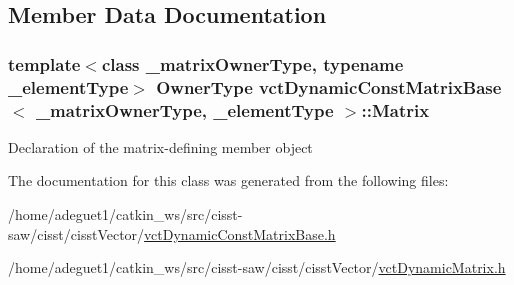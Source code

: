 \subsection{Member Data Documentation}
\hypertarget{classvct_dynamic_const_matrix_base_a46173996e3b23fd3dec1ff901a56b60c}{
\subsubsection[{Matrix}]{\setlength{\rightskip}{0pt plus 5cm}template$<$class \-\_\-matrix\-Owner\-Type, typename \-\_\-element\-Type$>$ {\bf Owner\-Type} {\bf vct\-Dynamic\-Const\-Matrix\-Base}$<$ \-\_\-matrix\-Owner\-Type, \-\_\-element\-Type $>$\-::Matrix\hspace{0.3cm}{\ttfamily [protected]}}}\label{classvct_dynamic_const_matrix_base_a46173996e3b23fd3dec1ff901a56b60c}
Declaration of the matrix-\/defining member object 

The documentation for this class was generated from the following files\-:\begin{DoxyCompactItemize}
\item 
/home/adeguet1/catkin\-\_\-ws/src/cisst-\/saw/cisst/cisst\-Vector/\hyperlink{vct_dynamic_const_matrix_base_8h}{vct\-Dynamic\-Const\-Matrix\-Base.\-h}\item 
/home/adeguet1/catkin\-\_\-ws/src/cisst-\/saw/cisst/cisst\-Vector/\hyperlink{vct_dynamic_matrix_8h}{vct\-Dynamic\-Matrix.\-h}\end{DoxyCompactItemize}
